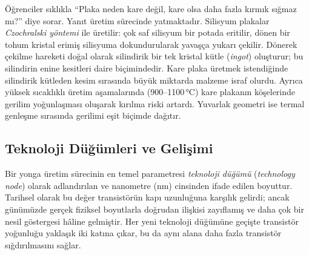 \begin{bilginot}
Öğrenciler sıklıkla ``Plaka neden kare değil, kare olsa daha fazla kırmık sığmaz mı?'' diye sorar. Yanıt üretim sürecinde yatmaktadır. Silisyum plakalar \emph{Czochralski yöntemi} ile üretilir: çok saf silisyum bir potada eritilir, dönen bir tohum kristal erimiş silisyuma dokundurularak yavaşça yukarı çekilir. Dönerek çekilme hareketi doğal olarak silindirik bir tek kristal kütle (\emph{ingot}) oluşturur; bu silindirin enine kesitleri daire biçimindedir. Kare plaka üretmek istendiğinde silindirik kütleden kesim sırasında büyük miktarda malzeme israf olurdu. Ayrıca yüksek sıcaklıklı üretim aşamalarında (900--1100\,°C) kare plakanın köşelerinde gerilim yoğunlaşması oluşarak kırılma riski artardı. Yuvarlak geometri ise termal genleşme sırasında gerilimi eşit biçimde dağıtır.
\end{bilginot}


\subsection{Teknoloji Düğümleri ve Gelişimi}
\label{sec:teknoloji-dugumleri}

Bir yonga üretim sürecinin en temel parametresi \emph{teknoloji düğümü} (\emph{technology node}) olarak adlandırılan ve nanometre (nm) cinsinden ifade edilen boyuttur. Tarihsel olarak bu değer transistörün kapı uzunluğuna karşılık gelirdi; ancak günümüzde gerçek fiziksel boyutlarla doğrudan ilişkisi zayıflamış ve daha çok bir nesil göstergesi hâline gelmiştir. Her yeni teknoloji düğümüne geçişte transistör yoğunluğu yaklaşık iki katına çıkar, bu da aynı alana daha fazla transistör sığdırılmasını sağlar.

